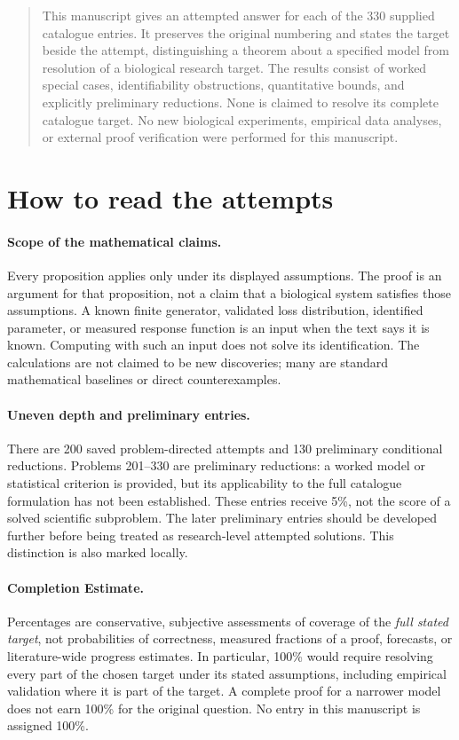 \documentclass[11pt]{article}
\begin{document}
\begin{quote}
This manuscript gives an attempted answer for each of the 330 supplied catalogue
entries. It preserves the original numbering and states the target beside the
attempt, distinguishing a theorem about a specified model from resolution of a
biological research target. The results consist of worked special cases,
identifiability obstructions, quantitative bounds, and explicitly preliminary
reductions. None is claimed to resolve its complete catalogue target. No new
biological experiments, empirical data analyses, or external proof verification
were performed for this manuscript.
\end{quote}

\section*{How to read the attempts}
\paragraph{Scope of the mathematical claims.}
Every proposition applies only under its displayed assumptions. The proof is an
argument for that proposition, not a claim that a biological system satisfies
those assumptions. A known finite generator, validated loss distribution,
identified parameter, or measured response function is an input when the text
says it is known. Computing with such an input does not solve its identification.
The calculations are not claimed to be new discoveries; many are standard
mathematical baselines or direct counterexamples.

\paragraph{Uneven depth and preliminary entries.}
There are 200 saved problem-directed attempts and 130 preliminary conditional reductions. Problems 201--330 are preliminary reductions: a worked model or statistical criterion is provided, but its applicability to the full catalogue formulation has not been established. These entries receive 5\%, not the score of a solved scientific subproblem. 
The later preliminary entries should be developed further before being treated
as research-level attempted solutions. This distinction is also marked locally.

\paragraph{Completion Estimate.}
Percentages are conservative, subjective assessments of coverage of the
\emph{full stated target}, not probabilities of correctness, measured fractions
of a proof, forecasts, or literature-wide progress estimates. In particular,
100\% would require resolving every part of the chosen target under its stated
assumptions, including empirical validation where it is part of the target.
A complete proof for a narrower model does not earn 100\% for the original
question. No entry in this manuscript is assigned 100\%.
\end{document}
